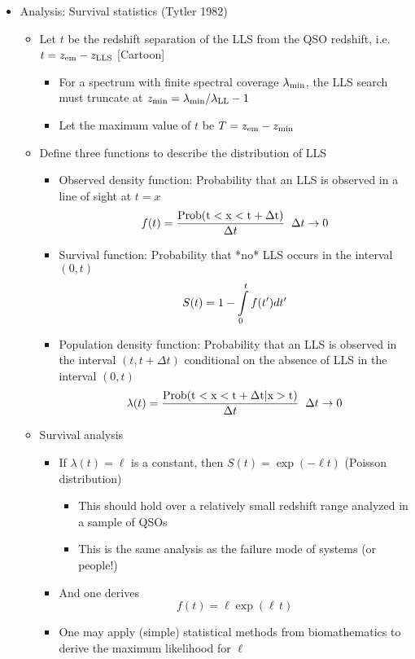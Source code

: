 \documentclass[12pt,letterpaper]{article}
\begin{document}
\begin{Aenumerate}
\begin{itemize}
  \item Analysis: Survival statistics (Tytler 1982)
	\begin{itemize}
	\item Let $t$ be the redshift separation of the LLS
	from the QSO redshift, i.e. $t = z_{\rm em} - z_{\rm LLS}$
	[Cartoon]
		\begin{itemize}
		\item For a spectrum with finite spectral coverage 
		$\lambda_{\rm min}$, the LLS search must truncate 
		at $z_{\rm min} = \lambda_{\rm min}/\lambda_{\rm LL} - 1$ 
		\item Let the maximum value of $t$ be $T = z_{\rm em} - z_{\rm min}$
		\end{itemize}
	\item Define three functions to describe the distribution of LLS
		\begin{itemize}
		\item Observed density function: Probability that an LLS is observed
		in a line of sight at $t=x$
		\begin{equation}
		f(t) = \frac{\rm Prob(t < x < t+\Delta t)}{\Delta t} \;\; 
		\Delta t \to 0
		\end{equation}
		\item Survival function: Probability that *no* LLS occurs in the
		interval $(0,t)$
		\begin{equation}
		S(t) = 1 - \int\limits_0^t f(t') dt'
		\end{equation}
		\item Population density function: Probability that an LLS is
		observed in the interval $(t,t+\Delta t)$ conditional on the
		absence of LLS in the interval $(0,t)$
		\begin{equation}
		\lambda(t) = \frac{\rm Prob(t < x < t+\Delta t|x>t)}{\Delta t} \;\; 
		\Delta t \to 0
		\end{equation}
		\end{itemize}
	\item Survival analysis
		\begin{itemize}
		\item If $\lambda(t) = \ell$ is a constant,  
		then $S(t) = \exp(-\ell t)$  (Poisson distribution)
			\begin{itemize}
			\item This should hold over a relatively small redshift range
			analyzed in a sample of QSOs
			\item This is the same analysis as the failure mode of systems
			(or people!)
			\end{itemize}
		\item And one derives
		\begin{equation}
		f(t) = \ell \exp(\ell \, t)
		\end{equation}
		\item One may apply (simple) statistical methods from biomathematics
		to derive the maximum likelihood for $\ell$
		\end{itemize}


\end{itemize}
\end{itemize}
\end{Aenumerate}
\end{document}
